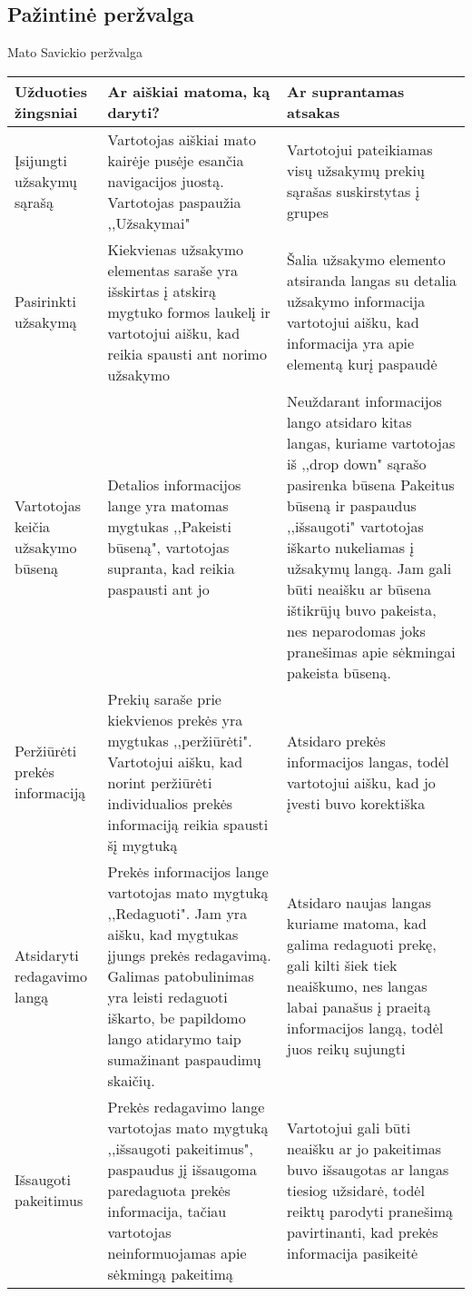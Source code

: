 \documentclass[oneside]{VUMIFPSkursinis}
\begin{document}
	\subsection{Pažintinė peržvalga}
Mato Savickio peržvalga
\begin{center}
    \begin{tabular}{ |p{4cm}| p{6cm} | p{7cm} | }
    \hline
    	Užduoties žingsniai & Ar aiškiai matoma, ką daryti? & Ar suprantamas atsakas \\ \hline 
	Įsijungti užsakymų sąrašą & Vartotojas aiškiai mato kairėje pusėje esančia navigacijos juostą.
					Vartotojas paspaužia ,,Užsakymai" & Vartotojui pateikiamas visų užsakymų prekių sąrašas suskirstytas į grupes \\ \hline
	Pasirinkti užsakymą & Kiekvienas užsakymo elementas saraše yra išskirtas į atskirą mygtuko formos laukelį ir vartotojui aišku, kad reikia spausti ant norimo užsakymo & Šalia užsakymo elemento atsiranda langas su detalia užsakymo informacija vartotojui aišku, kad informacija yra apie elementą kurį paspaudė \\ \hline
	Vartotojas keičia užsakymo būseną & Detalios informacijos lange yra matomas mygtukas ,,Pakeisti būseną", vartotojas supranta, kad reikia paspausti ant jo & Neuždarant informacijos lango atsidaro kitas langas, kuriame vartotojas iš ,,drop down" sąrašo pasirenka būsena  Pakeitus būseną ir paspaudus ,,išsaugoti" vartotojas iškarto nukeliamas į užsakymų langą.
Jam gali būti neaišku ar būsena ištikrūjų buvo pakeista, nes neparodomas joks pranešimas apie sėkmingai pakeista būseną. \\ \hline

	Peržiūrėti prekės informaciją & Prekių saraše prie kiekvienos prekės yra mygtukas ,,peržiūrėti".
	Vartotojui aišku, kad norint peržiūrėti individualios prekės informaciją reikia spausti šį mygtuką & Atsidaro prekės informacijos langas, todėl vartotojui aišku, kad jo įvesti buvo korektiška \\ \hline

	Atsidaryti redagavimo langą & Prekės informacijos lange vartotojas mato mygtuką ,,Redaguoti".
	Jam yra aišku, kad mygtukas įjungs prekės redagavimą. Galimas patobulinimas yra leisti redaguoti iškarto, be papildomo lango atidarymo taip sumažinant paspaudimų skaičių. 
	& Atsidaro naujas langas kuriame matoma, kad galima redaguoti prekę, gali kilti šiek tiek neaiškumo, nes langas labai panašus į praeitą informacijos langą, todėl juos reikų sujungti \\ \hline

	Išsaugoti pakeitimus & Prekės redagavimo lange vartotojas  mato mygtuką ,,išsaugoti pakeitimus", paspaudus jį išsaugoma paredaguota prekės informacija, tačiau vartotojas neinformuojamas apie sėkmingą pakeitimą & Vartotojui gali būti neaišku ar jo pakeitimas buvo išsaugotas ar langas tiesiog užsidarė, todėl reiktų parodyti pranešimą pavirtinanti, kad prekės informacija pasikeitė \\ \hline
   \hline
    \end{tabular}
\end{center}
\end{document}
